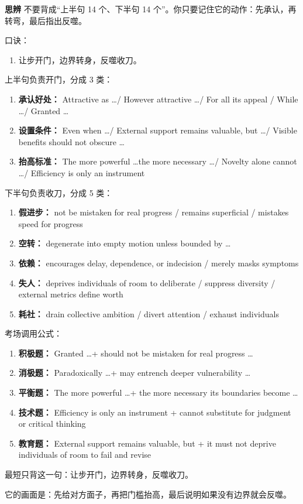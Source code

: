 ﻿\documentclass[lang=cn,11pt]{elegantbook}
\begin{document}
\begin{note}
\textbf{思辨} 不要背成“上半句 14 个、下半句 14 个”。你只要记住它的动作：先承认，再转弯，最后指出反噬。

口诀：

\begin{enumerate}
  \item 让步开门，边界转身，反噬收刀。
\end{enumerate}

上半句负责开门，分成 3 类：

\begin{enumerate}
  \item \textbf{承认好处：} Attractive as \ldots / However attractive \ldots / For all its appeal / While \ldots / Granted \ldots
  \item \textbf{设置条件：} Even when \ldots / External support remains valuable, but \ldots / Visible benefits should not obscure \ldots
  \item \textbf{抬高标准：} The more powerful \ldots the more necessary \ldots / Novelty alone cannot \ldots / Efficiency is only an instrument
\end{enumerate}

下半句负责收刀，分成 5 类：

\begin{enumerate}
  \item \textbf{假进步：} not be mistaken for real progress / remains superficial / mistakes speed for progress
  \item \textbf{空转：} degenerate into empty motion unless bounded by \ldots
  \item \textbf{依赖：} encourages delay, dependence, or indecision / merely masks symptoms
  \item \textbf{失人：} deprives individuals of room to deliberate / suppress diversity / external metrics define worth
  \item \textbf{耗社：} drain collective ambition / divert attention / exhaust individuals
\end{enumerate}

考场调用公式：

\begin{enumerate}
  \item \textbf{积极题：} Granted \ldots + should not be mistaken for real progress \ldots
  \item \textbf{消极题：} Paradoxically \ldots + may entrench deeper vulnerability \ldots
  \item \textbf{平衡题：} The more powerful \ldots + the more necessary its boundaries become \ldots
  \item \textbf{技术题：} Efficiency is only an instrument + cannot substitute for judgment or critical thinking
  \item \textbf{教育题：} External support remains valuable, but + it must not deprive individuals of room to fail and revise
\end{enumerate}

最短只背这一句：让步开门，边界转身，反噬收刀。

它的画面是：先给对方面子，再把门槛抬高，最后说明如果没有边界就会反噬。
\end{note}
\end{document}
